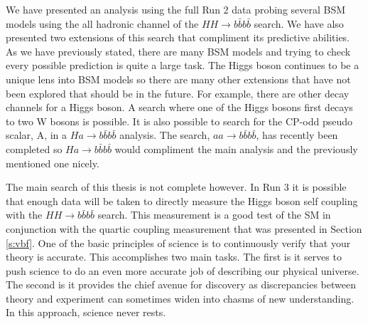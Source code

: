 \label{chap:conclusion}

We have presented an analysis using the full Run 2 data probing several BSM models using the all hadronic channel of the $HH \rightarrow b\bar{b}b\bar{b}$ search.
We have also presented two extensions of this search that compliment its predictive abilities. 
As we have previously stated, there are many BSM models and trying to check every possible prediction is quite a large task.
The Higgs boson continues to be a unique lens into BSM models so there are many other extensions that have not been explored that should be in the future.
For example, there are other decay channels for a Higgs boson. A search where one of the Higgs bosons first decays to two W bosons is possible.
It is also possible to search for the CP-odd pseudo scalar, A, in a $Ha \rightarrow b\bar{b}b\bar{b}$ analysis.
The search, $aa \rightarrow b\bar{b}b\bar{b}$, has recently been completed so $Ha \rightarrow b\bar{b}b\bar{b}$ would compliment the main analysis and the previously mentioned one nicely.

The main search of this thesis is not complete however. 
In Run 3 it is possible that enough data will be taken to directly measure the Higgs boson self coupling with the $HH \rightarrow b\bar{b}b\bar{b}$ search.
This measurement is a good test of the SM in conjunction with the quartic coupling measurement that was presented in Section \ref{s:vbf}.
One of the basic principles of science is to continuously verify that your theory is accurate.
This accomplishes two main tasks. The first is it serves to push science to do an even more accurate job of describing our physical universe.
The second is it provides the chief avenue for discovery as discrepancies between theory and experiment can sometimes widen into chasms of new understanding.
In this approach, science never rests.
